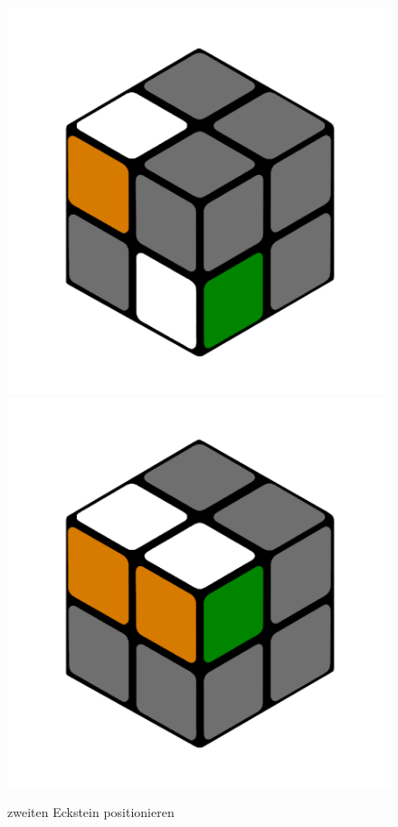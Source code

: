 \documentclass[12pt,a4paper, usenames, dvipsnames]{article}
\begin{document}
\begin{figure}[h]
\centering
\includegraphics[scale=0.1]{e1_s2_s1.png}
\includegraphics[scale=0.1]{e1_s2_s2.png}
\caption{zweiten Eckstein positionieren}
\label{31}
\end{figure}
\end{document}
